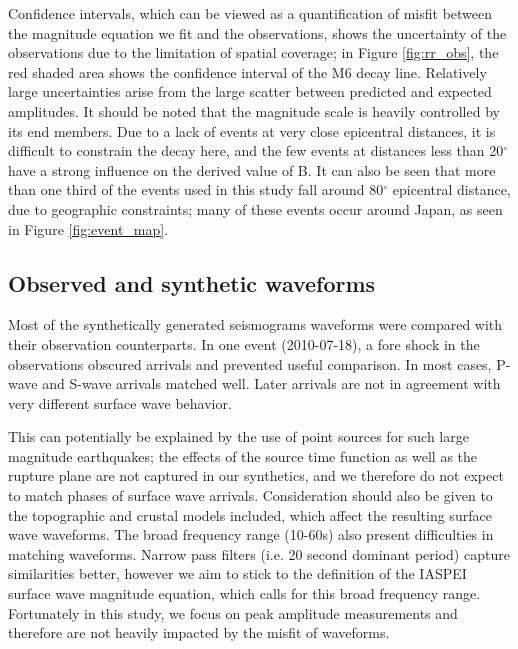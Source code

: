 \documentclass{gji}
\begin{document}
Confidence intervals, which can be viewed as a quantification of misfit between the magnitude equation we fit and the observations, shows the uncertainty of the observations due to the limitation of spatial coverage; in Figure \ref{fig:rr_obs}, the red shaded area shows the confidence interval of the M6 decay line. Relatively large uncertainties arise from the large scatter between predicted and expected amplitudes.%
It should be noted that the magnitude scale is heavily controlled by its end members. Due to a lack of events at very close epicentral distances, it is difficult to constrain the decay here, and the few events at distances less than 20$^\circ$ have a strong influence on the derived value of B. It can also be seen that more than one third of the events used in this study fall around 80$^\circ$ epicentral distance, due to geographic constraints; many of these events occur around Japan, as seen in Figure \ref{fig:event_map}.  

\subsection{Observed and synthetic waveforms}
Most of the synthetically generated seismograms waveforms were compared with their observation counterparts. In one event (2010-07-18), a fore shock in the observations obscured arrivals and prevented useful comparison. In most cases, P-wave and S-wave arrivals matched well. Later arrivals are not in agreement with very different surface wave behavior. 

This can potentially be explained by the use of point sources for such large magnitude earthquakes; the effects of the source time function as well as the rupture plane are not captured in our synthetics, and we therefore do not expect to match phases of surface wave arrivals. Consideration should also be given to the topographic and crustal models included, which affect the resulting surface wave waveforms. The broad frequency range (10-60s) also present difficulties in matching waveforms. Narrow pass filters (i.e. 20 second dominant period) capture similarities better, however we aim to stick to the definition of the IASPEI surface wave magnitude equation, which calls for this broad frequency range. Fortunately in this study, we focus on peak amplitude measurements and therefore are not heavily impacted by the misfit of waveforms.
\end{document}
